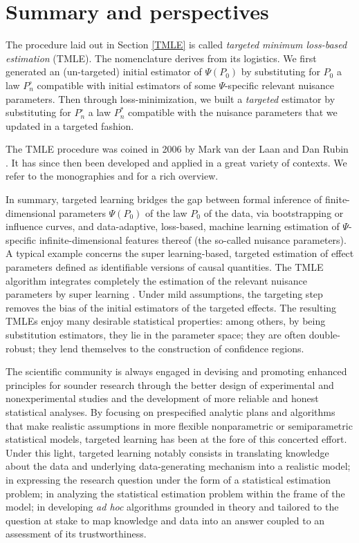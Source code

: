 \documentclass[11pt,openright,twoside]{book}
\newcommand{\Phat}{P^{\circ}}
\theoremstyle{definition}
\theoremstyle{definition}
\theoremstyle{definition}
\theoremstyle{remark}
\begin{document}
\hypertarget{summary-and-perspectives}{%
\section{Summary and perspectives}\label{summary-and-perspectives}}

The procedure laid out in Section \ref{TMLE} is called \emph{targeted minimum
loss-based estimation} (TMLE). The nomenclature derives from its logistics.
We first generated an (un-targeted) initial estimator of \(\Psi(P_0)\) by
substituting for \(P_{0}\) a law \(\Phat_{n}\) compatible with initial estimators
of some \(\Psi\)-specific relevant nuisance parameters. Then through
loss-minimization, we built a \emph{targeted} estimator by substituting for
\(\Phat_{n}\) a law \(P_{n}^{*}\) compatible with the nuisance parameters that we
updated in a targeted fashion.

The TMLE procedure was coined in 2006 by Mark van der Laan and Dan Rubin
\citep{TMLE06}. It has since then been developed and applied in a great variety of
contexts. We refer to the monographies \citep{TMLEbook11} and \citep{TMLEbook18} for a
rich overview.

In summary, targeted learning bridges the gap between formal inference of
finite-dimensional parameters \(\Psi(P_{0})\) of the law \(P_{0}\) of the data,
via bootstrapping or influence curves, and data-adaptive, loss-based, machine
learning estimation of \(\Psi\)-specific infinite-dimensional features thereof
(the so-called nuisance parameters). A typical example concerns the super
learning-based, targeted estimation of effect parameters defined as
identifiable versions of causal quantities. The TMLE algorithm integrates
completely the estimation of the relevant nuisance parameters by super
learning \citep{SL07}. Under mild assumptions, the targeting step removes the bias
of the initial estimators of the targeted effects. The resulting TMLEs enjoy
many desirable statistical properties: among others, by being substitution
estimators, they lie in the parameter space; they are often double-robust;
they lend themselves to the construction of confidence regions.

The scientific community is always engaged in devising and promoting enhanced
principles for sounder research through the better design of experimental and
nonexperimental studies and the development of more reliable and honest
statistical analyses. By focusing on prespecified analytic plans and
algorithms that make realistic assumptions in more flexible nonparametric or
semiparametric statistical models, targeted learning has been at the fore of
this concerted effort. Under this light, targeted learning notably consists in
translating knowledge about the data and underlying data-generating mechanism
into a realistic model; in expressing the research question under the form of
a statistical estimation problem; in analyzing the statistical estimation
problem within the frame of the model; in developing \emph{ad hoc} algorithms
grounded in theory and tailored to the question at stake to map knowledge and
data into an answer coupled to an assessment of its trustworthiness.
\end{document}
